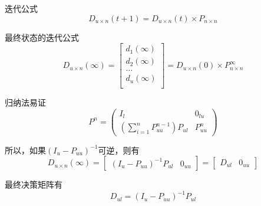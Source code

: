 \documentclass[notheorems, UTF8]{beamer}
\theoremstyle{plain}
\begin{document}
\begin{frame}
迭代公式
\begin{displaymath}
D_{u \times n}(t + 1) = D_{u \times n}(t) \times P_{n \times n}
\end{displaymath}

最终状态的迭代公式
\begin{displaymath}
D_{u \times n}(\infty) = \left[
\begin{array}{c}
d_1(\infty) \\
d_2(\infty) \\
\ldots \\
d_u(\infty) \\
\end{array}
\right] = D_{u \times n}(0) \times P_{n \times n}^{\infty}
\end{displaymath}

归纳法易证
\begin{displaymath}
P^n =  \left(
\begin{array}{ll}
I_{ l}      & 0_{l u}\\
\left(\sum_{i=1}^{n} P_{uu}^{n-1} \right) P_{ul} & P_{uu}^n
\end{array}
\right) 
\end{displaymath}

所以，如果$(I_u-P_{uu})^{-1}$可逆，则有
\begin{displaymath}
D_{u \times n}(\infty) = \left[
\begin{array}{ll}
(I_u - P_{uu})^{-1}P_{ul} & 0_{uu}
\end{array}
\right] = \left[
\begin{array}{ll}
D_{ul} & 0_{uu}
\end{array}
\right]
\end{displaymath}

最终决策矩阵有
\begin{displaymath}
D_{ul} = (I_u - P_{uu})^{-1}P_{ul}
\end{displaymath}
\end{frame}
\end{document}
